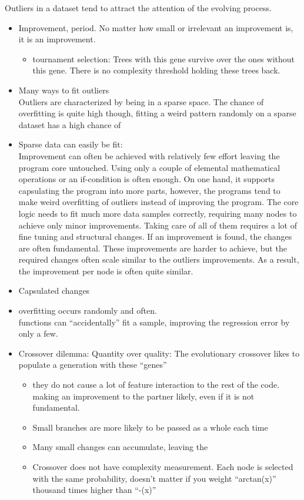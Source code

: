 Outliers in a dataset tend to attract the attention of the evolving process.
\begin{itemize}
    \item Improvement, period. No matter how small or irrelevant an improvement is, it is an improvement.
    \begin{itemize}
        \item tournament selection: Trees with this gene survive over the ones without this gene. There is no complexity threshold holding these trees back.
    \end{itemize}

\item Many ways to fit outliers\\
Outliers are characterized by being in a sparse space.
The chance of overfitting is quite high though, fitting a weird pattern randomly on a sparse dataset has a high chance of  

\item Sparse data can easily be fit:\\
Improvement can often be achieved with relatively few effort leaving the program core untouched. Using only a couple of elemental mathematical operations or an if-condition is often enough. On one hand, it supports capsulating the program into more parts, however, the programs tend to make weird overfitting of outliers instead of improving the program.
The core logic needs to fit much more data samples correctly, requiring many nodes to achieve only minor improvements. Taking care of all of them requires a lot of fine tuning and structural changes. 
If an improvement is found, the changes are often fundamental. These improvements are harder to achieve, but the required changes often scale similar to the outliers improvements. As a result, the improvement per node is often quite similar.

\item Capsulated changes

\item overfitting occurs randomly and often.\\
functions can ``accidentally'' fit a sample, improving the regression error by only a few.

\item Crossover dilemma: Quantity over quality: The evolutionary crossover likes to populate a generation with these ``genes''

\begin{itemize}
    \item they do not cause a lot of feature interaction to the rest of the code. making an improvement to the partner likely, even if it is not fundamental.
    \item Small branches are more likely to be passed as a whole each time
    \item Many small changes can accumulate, leaving the 
    \item Crossover does not have complexity measurement. Each node is selected with the same probability, doesn't matter if you weight ``arctan(x)'' thousand times higher than ``-(x)''
\end{itemize}


\end{itemize}
